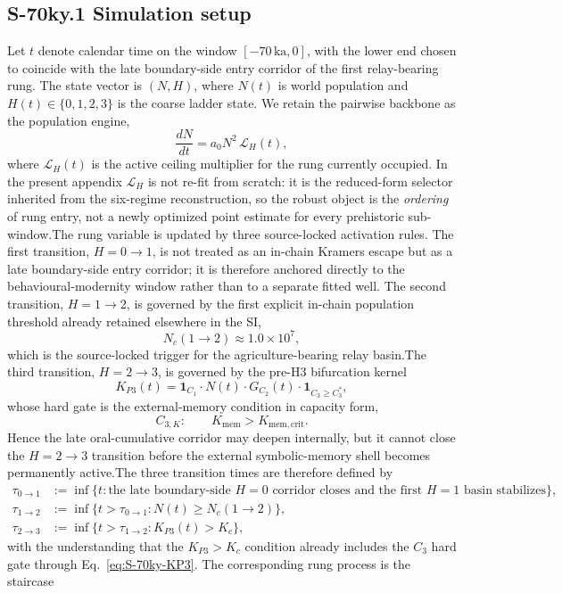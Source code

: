 \documentclass[11pt]{article}
\begin{document}
\subsection*{S-70ky.1 Simulation setup}
\label{sec:S-70ky.1}Let $t$ denote calendar time on the window $[-70\,\mathrm{ka},0]$, with the lower end chosen to coincide with the late boundary-side entry corridor of the first relay-bearing rung. The state vector is $(N,H)$, where $N(t)$ is world population and $H(t)\in\{0,1,2,3\}$ is the coarse ladder state. We retain the pairwise backbone as the population engine,
\begin{equation}\frac{dN}{dt}=a_0N^2\,\mathcal{L}_H(t),
\label{eq:S-70ky-backbone}
\end{equation}where $\mathcal{L}_H(t)$ is the active ceiling multiplier for the rung currently occupied. In the present appendix $\mathcal{L}_H$ is not re-fit from scratch: it is the reduced-form selector inherited from the six-regime reconstruction, so the robust object is the \emph{ordering} of rung entry, not a newly optimized point estimate for every prehistoric sub-window.The rung variable is updated by three source-locked activation rules. The first transition, $H{=}0\to 1$, is not treated as an in-chain Kramers escape but as a late boundary-side entry corridor; it is therefore anchored directly to the behavioural-modernity window rather than to a separate fitted well. The second transition, $H{=}1\to 2$, is governed by the first explicit in-chain population threshold already retained elsewhere in the SI,
\begin{equation}N_c(1\to 2)\approx 1.0\times 10^{7},
\label{eq:S-70ky-Nc12}
\end{equation}which is the source-locked trigger for the agriculture-bearing relay basin.The third transition, $H{=}2\to 3$, is governed by the pre-H3 bifurcation kernel
\begin{equation}K_{P3}(t)=\mathbf{1}_{C_1}\cdot N(t)\cdot G_{C_2}(t)\cdot \mathbf{1}_{C_3\ge C_3^{\ast}},
\label{eq:S-70ky-KP3}
\end{equation}whose hard gate is the external-memory condition in capacity form,
\begin{equation}C_{3,K}:\qquad K_{\mathrm{mem}}>K_{\mathrm{mem,crit}}.
\label{eq:S-70ky-C3K}
\end{equation}Hence the late oral-cumulative corridor may deepen internally, but it cannot close the $H{=}2\to 3$ transition before the external symbolic-memory shell becomes permanently active.The three transition times are therefore defined by
\begin{align}\tau_{0\to 1}&:=\inf\{t:\text{the late boundary-side }H{=}0\text{ corridor closes and the first }H{=}1\text{ basin stabilizes}\},
\label{eq:S-70ky-tau01}\\\tau_{1\to 2}&:=\inf\{t>\tau_{0\to 1}:N(t)\ge N_c(1\to 2)\},
\label{eq:S-70ky-tau12}\\\tau_{2\to 3}&:=\inf\{t>\tau_{1\to 2}:K_{P3}(t)>K_c\},
\label{eq:S-70ky-tau23}
\end{align}with the understanding that the $K_{P3}>K_c$ condition already includes the $C_3$ hard gate through Eq.~\eqref{eq:S-70ky-KP3}. The corresponding rung process is the staircase
\end{document}
